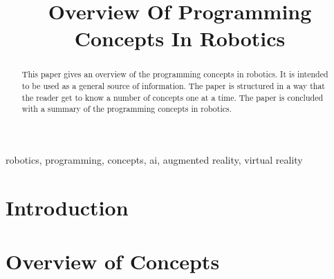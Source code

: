 \documentclass[conference]{IEEEtran}
\begin{document}
\title{Overview Of Programming Concepts In Robotics\\}

\author{

    \and
}

\maketitle

\begin{abstract}
    This paper gives an overview of the programming concepts in robotics. It is intended to be used as a general source of information. The paper is structured in a way that the reader get to know a number of concepts one at a time. The paper is concluded with a summary of the programming concepts in robotics.
\end{abstract}

\begin{IEEEkeywords}
    robotics, programming, concepts, ai, augmented reality, virtual reality
\end{IEEEkeywords}

\section{Introduction}
  
\section{Overview of Concepts}
\end{document}
